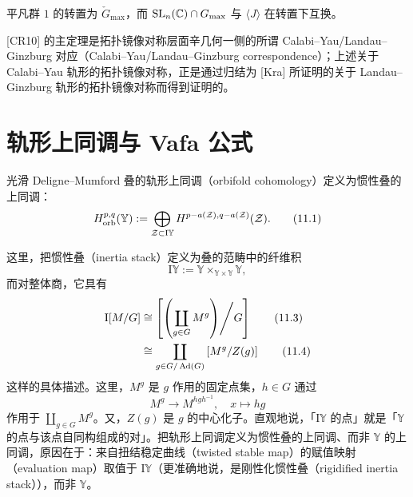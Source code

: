 
平凡群 $1$ 的转置为 $\check G_{\max}$，而 $\mathrm{SL}_n(\mathbb{C})\cap G_{\max}$ 与 $\langle J\rangle$ 在转置下互换。

[CR10] 的主定理是拓扑镜像对称层面辛几何一侧的所谓 Calabi–Yau/Landau–Ginzburg 对应（Calabi–Yau/Landau–Ginzburg correspondence）；上述关于 Calabi–Yau 轨形的拓扑镜像对称，正是通过归结为 [Kra] 所证明的关于 Landau–Ginzburg 轨形的拓扑镜像对称而得到证明的。

\section{轨形上同调与 Vafa 公式}

光滑 Deligne–Mumford 叠的轨形上同调（orbifold cohomology）定义为惯性叠的上同调：
\begin{equation}
    H^{p,q}_{\mathrm{orb}}(\mathbb{Y}) := \bigoplus_{\mathcal{Z}\subset\mathrm{I}\mathbb{Y}} H^{p-a(\mathcal{Z}),q-a(\mathcal{Z})}(\mathcal{Z}). \tag{11.1}
\end{equation}

这里，把惯性叠（inertia stack）定义为叠的范畴中的纤维积
\begin{equation}
    \mathrm{I}\mathbb{Y} := \mathbb{Y}\times_{\mathbb{Y}\times\mathbb{Y}}\mathbb{Y}, \tag{11.2}
\end{equation}
而对整体商，它具有
\begin{align}
    \mathrm{I}[M/G] &\cong \left[\left(\coprod_{g\in G}M^{g}\right)\middle/ G\right] \tag{11.3}\\
    &\cong \coprod_{g\in G/\operatorname{Ad}(G)} \left[M^{g}/Z(g)\right] \tag{11.4}
\end{align}
这样的具体描述。这里，$M^{g}$ 是 $g$ 作用的固定点集，$h\in G$ 通过
\begin{equation}
    M^{g}\to M^{hgh^{-1}},\quad x\mapsto hg \tag{11.5}
\end{equation}
作用于 $\coprod_{g\in G}M^{g}$。又，$Z(g)$ 是 $g$ 的中心化子。直观地说，「$\mathrm{I}\mathbb{Y}$ 的点」就是「$\mathbb{Y}$ 的点与该点自同构组成的对」。把轨形上同调定义为惯性叠的上同调、而非 $\mathbb{Y}$ 的上同调，原因在于：来自扭结稳定曲线（twisted stable map）的赋值映射（evaluation map）取值于 $\mathrm{I}\mathbb{Y}$（更准确地说，是刚性化惯性叠（rigidified inertia stack）），而非 $\mathbb{Y}$。

